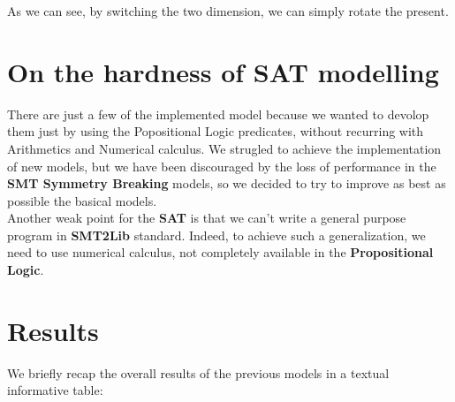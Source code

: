 As we can see, by switching the two dimension, we can simply rotate the present.



\section{On the hardness of SAT modelling}
There are just a few of the implemented model because we wanted to devolop them just by using the Popositional Logic predicates, without recurring with Arithmetics
and Numerical calculus. We strugled to achieve the implementation of new models, but we have been discouraged by the loss of performance in the \textbf{SMT Symmetry Breaking} models,
so we decided to try to improve as best as possible the basical models.\\
Another weak point for the \textbf{SAT} is that we can't write a general purpose program in \textbf{SMT2Lib} standard. Indeed, to achieve such a generalization, we need to use
numerical calculus, not completely available in the \textbf{Propositional Logic}. 

\section{Results}
We briefly recap the overall results of the previous models in a textual informative table:

